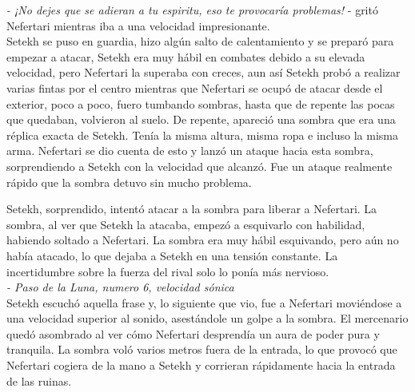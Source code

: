 \textit{- ¡No dejes que se adieran a tu espiritu, eso te provocaría problemas!} - gritó Nefertari mientras iba a una velocidad impresionante.\\
Setekh se puso en guardia, hizo algún salto de calentamiento y se preparó para empezar a atacar, Setekh era muy hábil en combates debido a su elevada velocidad, pero Nefertari la superaba con creces, aun así Setekh probó a realizar varias fintas por el centro mientras que Nefertari se ocupó de atacar desde el exterior, poco a poco, fuero tumbando sombras,
hasta que de repente las pocas que quedaban, volvieron al suelo.
De repente, apareció una sombra que era una réplica exacta de Setekh. Tenía la misma altura, misma ropa e incluso la misma arma. Nefertari se dio cuenta de esto y lanzó un ataque hacia esta sombra, sorprendiendo a Setekh con la velocidad que alcanzó. Fue un ataque realmente rápido que la sombra detuvo sin mucho problema.

Setekh, sorprendido, intentó atacar a la sombra para liberar a Nefertari. La sombra, al ver que Setekh la atacaba, empezó a esquivarlo con habilidad, habiendo soltado a Nefertari. La sombra era muy hábil esquivando, pero aún no había atacado, lo que dejaba a Setekh en una tensión constante. La incertidumbre sobre la fuerza del rival solo lo ponía más nervioso.\\
\textit{- Paso de la Luna, numero 6, velocidad sónica}\\
Setekh escuchó aquella frase y, lo siguiente que vio, fue a Nefertari moviéndose a una velocidad superior al sonido, asestándole un golpe a la sombra. El mercenario quedó asombrado al ver cómo Nefertari desprendía un aura de poder pura y tranquila. La sombra voló varios metros fuera de la entrada, lo que provocó que Nefertari cogiera de la mano a Setekh y corrieran rápidamente hacia la entrada de las ruinas.

